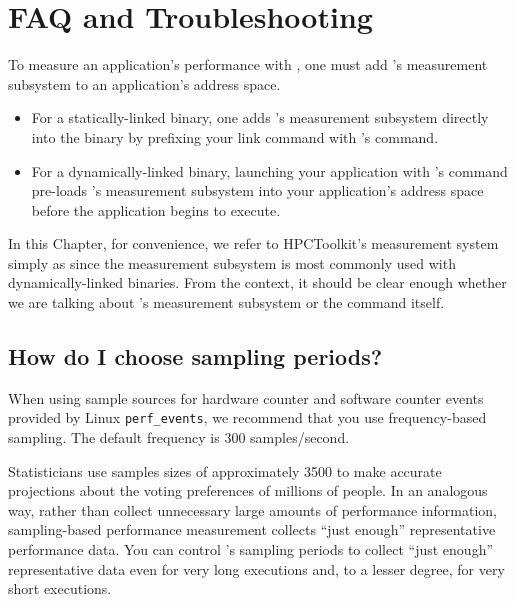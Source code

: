 \documentclass[11pt,letterpaper]{report}
\begin{document}
\chapter{FAQ and Troubleshooting}
\label{chpt:faq-troubleshooting}

To measure an application's performance with \HPCToolkit, one must add
\HPCToolkit's measurement subsystem to an application's address
space.  
\begin{itemize}
\item
For a statically-linked binary, one adds \HPCToolkit's
measurement subsystem directly into the binary 
by prefixing your link command
with \HPCToolkit{}'s \hpclink{} command.  
\item 
For a dynamically-linked
binary, launching your application with \HPCToolkit's \hpcrun{}
command pre-loads \HPCToolkit's measurement subsystem into your
application's address space before the application begins to execute. 
\end{itemize}
In this Chapter, for convenience, we refer to HPCToolkit's measurement
system simply as \hpcrun{} since the measurement subsystem is most commonly used
with dynamically-linked binaries. From the context, it should be clear enough
whether we are talking about \HPCToolkit's measurement subsystem
or the \hpcrun{} command itself.


\section{How do I choose \hpcrun{} sampling periods?}
\label{sec:troubleshooting:hpcrun-sample-periods}

When using sample sources for hardware counter and software counter events provided by Linux \verb|perf_events|, 
we recommend that you use frequency-based sampling. The default frequency is 300 samples/second. 

Statisticians use samples sizes of approximately 3500 to make accurate projections about the voting preferences of millions of people.
In an analogous way, rather than collect unnecessary large amounts of performance information, sampling-based performance measurement collects ``just enough'' representative performance data.
You can control \hpcrun{}'s sampling periods to collect ``just enough'' representative data even for very long executions and, to a lesser degree, for very short executions.
\end{document}
